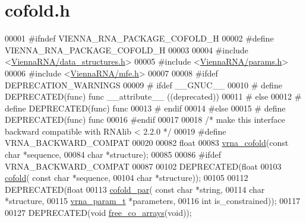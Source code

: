 \hypertarget{cofold_8h_source}{}\section{cofold.\+h}
\label{cofold_8h_source}

\begin{DoxyCode}
00001 \textcolor{preprocessor}{#ifndef VIENNA\_RNA\_PACKAGE\_COFOLD\_H}
00002 \textcolor{preprocessor}{#define VIENNA\_RNA\_PACKAGE\_COFOLD\_H}
00003 
00004 \textcolor{preprocessor}{#include <\hyperlink{data__structures_8h}{ViennaRNA/data\_structures.h}>}
00005 \textcolor{preprocessor}{#include <\hyperlink{params_8h}{ViennaRNA/params.h}>}
00006 \textcolor{preprocessor}{#include <\hyperlink{mfe_8h}{ViennaRNA/mfe.h}>}
00007 
00008 \textcolor{preprocessor}{#ifdef DEPRECATION\_WARNINGS}
00009 \textcolor{preprocessor}{# ifdef \_\_GNUC\_\_}
00010 \textcolor{preprocessor}{#  define DEPRECATED(func) func \_\_attribute\_\_ ((deprecated))}
00011 \textcolor{preprocessor}{# else}
00012 \textcolor{preprocessor}{#  define DEPRECATED(func) func}
00013 \textcolor{preprocessor}{# endif}
00014 \textcolor{preprocessor}{#else}
00015 \textcolor{preprocessor}{# define DEPRECATED(func) func}
00016 \textcolor{preprocessor}{#endif}
00017 
00018 \textcolor{comment}{/* make this interface backward compatible with RNAlib < 2.2.0 */}
00019 \textcolor{preprocessor}{#define VRNA\_BACKWARD\_COMPAT}
00020 
00082 \textcolor{keywordtype}{float}
00083 \hyperlink{group__mfe__cofold_ga9ef3a297201dbf838a8daff2b45c0c82}{vrna\_cofold}(\textcolor{keyword}{const} \textcolor{keywordtype}{char} *sequence,
00084             \textcolor{keywordtype}{char} *structure);
00085 
00086 \textcolor{preprocessor}{#ifdef VRNA\_BACKWARD\_COMPAT}
00087 
00102 DEPRECATED(\textcolor{keywordtype}{float}
00103 \hyperlink{group__mfe__cofold_gabc8517f22cfe70595ee81fc837910d52}{cofold}( \textcolor{keyword}{const} \textcolor{keywordtype}{char} *sequence,
00104         \textcolor{keywordtype}{char} *structure));
00105 
00112 DEPRECATED(\textcolor{keywordtype}{float}
00113 \hyperlink{group__mfe__cofold_ga7612cfeeb1b793f1e4179b1eb53df1f3}{cofold\_par}( \textcolor{keyword}{const} \textcolor{keywordtype}{char} *\textcolor{keywordtype}{string},
00114             \textcolor{keywordtype}{char} *structure,
00115             \hyperlink{group__energy__parameters_structvrna__param__s}{vrna\_param\_t} *parameters,
00116             \textcolor{keywordtype}{int} is\_constrained));
00117 
00127 DEPRECATED(\textcolor{keywordtype}{void} \hyperlink{group__mfe__cofold_gaafb33d7473eb9af9d1b168ca8761c41a}{free\_co\_arrays}(\textcolor{keywordtype}{void}));

\end{DoxyCode}
